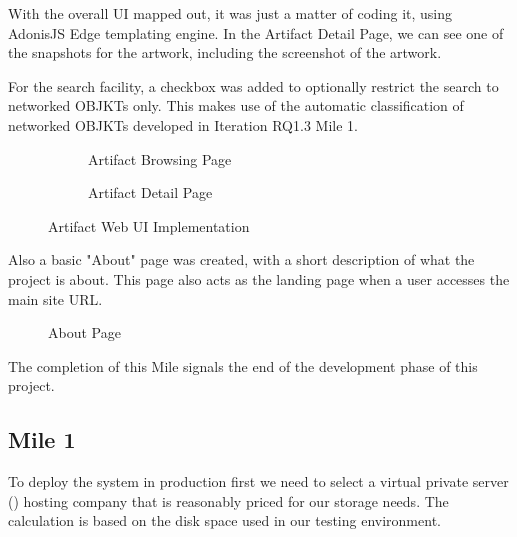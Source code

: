 With the overall UI mapped out, it was just a matter of coding it, using AdonisJS Edge templating engine. In the Artifact Detail Page, we can see one of the snapshots for the artwork, including the screenshot of the artwork.

For the search facility, a checkbox was added to optionally restrict the search to networked OBJKTs only. This makes use of the automatic classification of networked OBJKTs developed in Iteration RQ1.3 Mile 1.

\begin{figure}[H]
  \centering
  \begingroup
  \setlength{\fboxsep}{0pt} %
  \setlength{\fboxrule}{1pt} %
  \begin{subfigure}[b]{0.45\textwidth}
    \centering
    \caption{Artifact Browsing Page}
    \label{fig:wireframe1}
  \end{subfigure}
  \hfill
  \begin{subfigure}[b]{0.45\textwidth}
    \centering
    \caption{Artifact Detail Page}
    \label{fig:wireframe2}
  \end{subfigure}
  \endgroup
  \caption{Artifact Web UI Implementation}
  \label{fig:web-implementation}
\end{figure}

Also a basic "About" page was created, with a short description of what the project is about. This page also acts as the landing page when a user accesses the main site URL.

\begin{figure}[H]
    \centering
    \begingroup
    \setlength{\fboxsep}{0pt} %
    \setlength{\fboxrule}{1pt} %
    \endgroup
    \caption[About Page]{About Page}
    \label{fig:about-page}
\end{figure}



The completion of this Mile signals the end of the development phase of this project.

\subsection {Mile 1}

To deploy the system in production first we need to select a virtual private server () hosting company that is reasonably priced for our storage needs. The calculation is based on the disk space used in our testing environment.

